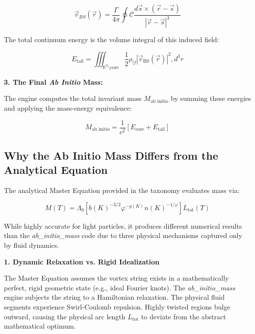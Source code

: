 \documentclass[11pt]{article}
\begin{document}
\begin{equation}
\vec{v}_{BS}(\vec{r}) = \frac{\Gamma}{4\pi} \oint{\mathcal{C}} \frac{d\vec{s} \times (\vec{r} - \vec{s})}{|\vec{r} - \vec{s}|^3}
\end{equation}

The total continuum energy is the volume integral of this induced field:

\begin{equation}
E_{\text{tail}} = \iiint_{\mathbb{R}^3 \setminus \text{core}} \frac{1}{2} \rho_{!f} |\vec{v}_{\text{BS}}(\vec{r})|^2 , d^3r
\end{equation}

\textbf{3. The Final \textit{Ab Initio} Mass:}

The engine computes the total invariant mass $M_{\text{ab initio}}$ by summing these energies and applying the mass-energy equivalence:

\begin{equation}
M_{\text{ab initio}} = \frac{1}{c^2} \left[ E_{\text{core}} + E_{\text{tail}} \right]\end{equation}

\subsection*{Why the Ab Initio Mass Differs from the Analytical Equation}

The analytical Master Equation provided in the taxonomy evaluates mass via:

\begin{equation}
M(T) = \Lambda_0 \left[ b(K)^{-3/2} \varphi^{-g(K)} n(K)^{-1/\varphi} \right] L_{\mathrm{tot}}(T)
\end{equation}

While highly accurate for light particles, it produces different numerical results than the \textit{ab_initio_mass} code due to three physical mechanisms captured only by fluid dynamics.

\textbf{1. Dynamic Relaxation vs. Rigid Idealization}

The Master Equation assumes the vortex string exists in a mathematically perfect, rigid geometric state (e.g., ideal Fourier knots). The \textit{ab_initio_mass} engine subjects the string to a Hamiltonian relaxation. The physical fluid segments experience Swirl-Coulomb repulsion. Highly twisted regions bulge outward, causing the physical arc length $L_{\mathrm{tot}}$ to deviate from the abstract mathematical optimum.
\end{document}
